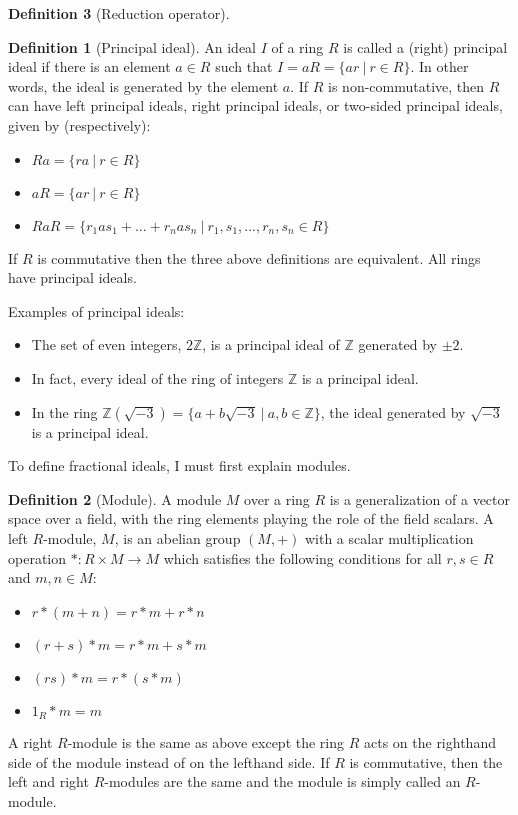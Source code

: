 \documentclass{article}
\theoremstyle{definition}
\newtheorem{definition}{Definition}[section]
\theoremstyle{theorem}
\theoremstyle{example}
\theoremstyle{corollary}
\begin{document}
\begin{definition}[Reduction operator]
\bigskip

\theoremstyle{definition}
\begin{definition}[Principal ideal]
An ideal \(I\) of a ring \(R\) is called a (right) principal ideal if there is an element \(a \in R\) such that \(I = aR = \{ ar \ | \ r \in R \}\). In other words, the ideal is generated by the element \(a\)\). If \(R\) is non-commutative, then \(R\) can have left principal ideals, right principal ideals, or two-sided principal ideals, given by (respectively):
\begin{itemize}
\item \(Ra = \{ ra \ | \ r \in R \} \)
\item \(aR = \{ ar \ | \ r \in R \} \)
\item \(RaR = \{ r_{1} a s_{1} + . . . + r_{n} a s_{n} \ | \ r_{1}, s_{1}, . . . , r_{n}, s_{n} \in R \} \)
\end{itemize}
If \(R\) is commutative then the three above definitions are equivalent. All rings have principal ideals.
\end{definition}

\bigskip

Examples of principal ideals:
\begin{itemize}
\item The set of even integers, \(2\mathbb{Z}\), is a principal ideal of \(\mathbb{Z}\) generated by \(\pm 2\).
\item In fact, every ideal of the ring of integers \(\mathbb{Z}\) is a principal ideal.
\item In the ring \(\mathbb{Z}(\sqrt{-3}) = \{ a + b \sqrt{-3} \ | \ a,b \in \mathbb{Z} \} \), the ideal generated by \(\sqrt{-3}\) is a principal ideal.
\end{itemize}

\bigskip

To define fractional ideals, I must first explain modules.

\bigskip

\theoremstyle{definition}
\begin{definition}[Module]
A module \(M\) over a ring \(R\) is a generalization of a vector space over a field, with the ring elements playing the role of the field scalars. A left \(R\)-module, \(M\), is an abelian group \((M, +)\) with a scalar multiplication operation \(* : R \times M \rightarrow M\) which satisfies the following conditions for all \(r, s \in R\) and \(m, n \in M\):
\begin{itemize}
\item \(r * (m + n) = r * m + r * n\)
\item \((r + s) * m = r * m + s * m\)
\item \((rs) * m = r * (s * m)\)
\item \(1_{R} * m = m\)
\end{itemize}
A right \(R\)-module is the same as above except the ring \(R\) acts on the righthand side of the module instead of on the lefthand side. If \(R\) is commutative, then the left and right \(R\)-modules are the same and the module is simply called an \(R\)-module.
\end{definition}


\end{definition}
\end{document}
